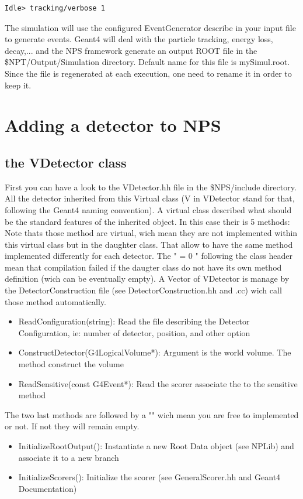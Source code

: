 \documentclass{book}
\begin{document}
\begin{verbatim}
Idle> tracking/verbose 1
\end{verbatim}

The simulation will use the configured EventGenerator describe in your input file to generate events. 
Geant4 will deal with the particle tracking, energy loss, decay,... 
and the NPS framework generate an output ROOT file in the \$NPT/Output/Simulation directory. Default name for this file is mySimul.root. 
Since the file is regenerated at each execution, one need to rename it in order to keep it.

\section{ Adding a detector to NPS }

\subsection{ the VDetector class}

First you can have a look to the VDetector.hh file in the \$NPS/include directory. 
All the detector inherited from this Virtual class (V in VDetector stand for that, following the Geant4 naming convention). 
A virtual class described what should be the standard features of the inherited object. 
In this case their is 5 methods: Note thats those method are virtual, wich mean they are not implemented within this virtual class but in the daughter class. 
That allow to have the same method implemented differently for each detector. 
The " = 0 " following the class header mean that compilation failed if the daugter class do not have its own method definition (wich can be eventually empty).
A Vector of VDetector is manage by the DetectorConstruction file (see DetectorConstruction.hh and .cc) wich call those method automatically.

	\begin{itemize}
		\item[] ReadConfiguration(string): Read the file describing the Detector Configuration, ie: number of detector, position, and other option
		\item[] ConstructDetector(G4LogicalVolume*): Argument is the world volume. The method construct the volume
		\item[] ReadSensitive(const G4Event*): Read the scorer associate the to the sensitive method
	\end{itemize}
	
The two last methods are followed by a "{}" wich mean you are free to implemented or not. 
If not they will remain empty.
	\begin{itemize}
		\item[] InitializeRootOutput(): Instantiate a new Root Data object (see NPLib) and associate it to a new branch
		\item[] InitializeScorers(): Initialize the scorer (see GeneralScorer.hh and Geant4 Documentation)
	\end{itemize}
\end{document}
